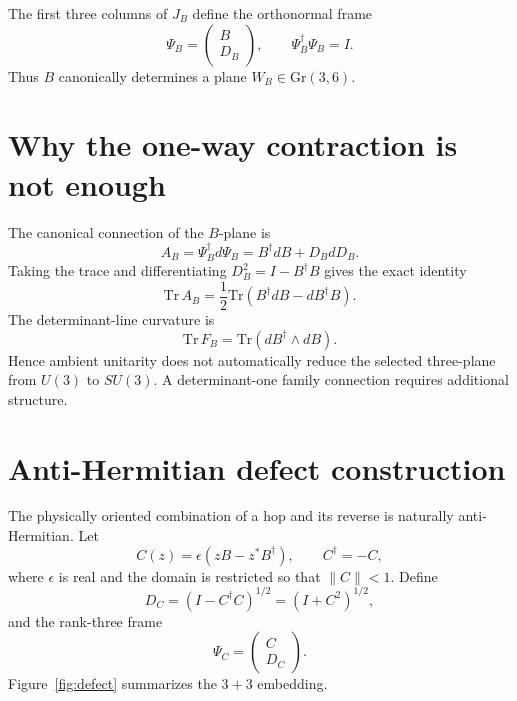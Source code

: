 \documentclass[11pt]{article}
\theoremstyle{remark}\newtheorem{remark}{Remark}
\begin{document}
The first three columns of $J_B$ define the orthonormal frame
\begin{equation}
\Psi_B=\begin{pmatrix}B\\D_B\end{pmatrix},\qquad \Psi_B^\dagger\Psi_B=I.
\end{equation}
Thus $B$ canonically determines a plane $W_B\in \mathrm{Gr}(3,6)$.

\section{Why the one-way contraction is not enough}
The canonical connection of the $B$-plane is
\begin{equation}
A_B=\Psi_B^\dagger d\Psi_B=B^\dagger dB+D_BdD_B.
\end{equation}
Taking the trace and differentiating $D_B^2=I-B^\dagger B$ gives the exact identity
\begin{equation}
\mathrm{Tr}\,A_B=\frac12\mathrm{Tr}(B^\dagger dB-dB^\dagger B).
\label{eq:traceB}
\end{equation}
The determinant-line curvature is
\begin{equation}
\mathrm{Tr}\,F_B=\mathrm{Tr}(dB^\dagger\wedge dB).
\end{equation}
Hence ambient unitarity does not automatically reduce the selected three-plane from $U(3)$ to $SU(3)$. A determinant-one family connection requires additional structure.

\section{Anti-Hermitian defect construction}
The physically oriented combination of a hop and its reverse is naturally anti-Hermitian. Let
\begin{equation}
C(z)=\epsilon\left(zB-z^*B^\dagger\right),\qquad C^\dagger=-C,
\label{eq:C}
\end{equation}
where $\epsilon$ is real and the domain is restricted so that $\|C\|<1$. Define
\begin{equation}
D_C=(I-C^\dagger C)^{1/2}=(I+C^2)^{1/2},
\end{equation}
and the rank-three frame
\begin{equation}
\Psi_C=\begin{pmatrix}C\\D_C\end{pmatrix}.
\end{equation}
Figure~\ref{fig:defect} summarizes the $3+3$ embedding.
\end{document}
